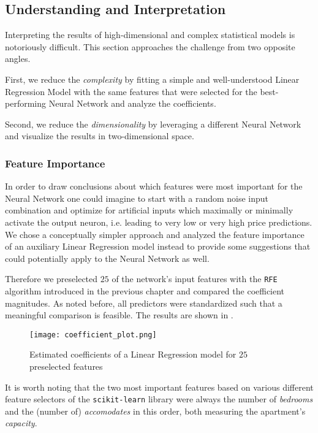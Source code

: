 \subsection{Understanding and Interpretation}

Interpreting the results of high-dimensional and complex statistical models is notoriously difficult.
This section approaches the challenge from two opposite angles.

First, we reduce the \emph{complexity} by fitting a simple and well-understood Linear Regression Model with the same features that were selected for the best-performing Neural Network and analyze the coefficients.

Second, we reduce the \emph{dimensionality} by leveraging a different Neural Network and visualize the results in two-dimensional space.

\subsubsection{Feature Importance}

In order to draw conclusions about which features were most important for the Neural Network one could imagine to start with a random noise input combination and optimize for artificial inputs which maximally or minimally activate the output neuron, i.e. leading to very low or very high price predictions.
We chose a conceptually simpler approach and analyzed the feature importance of an auxiliary Linear Regression model instead to provide some suggestions that could potentially apply to the Neural Network as well.

Therefore we preselected $25$ of the network's input features with the \texttt{RFE} algorithm introduced in the previous chapter and compared the coefficient magnitudes.
As noted before, all predictors were standardized such that a meaningful comparison is feasible.
The results are shown in .

\begin{figure}[t]
  \centering
  \texttt{[image: coefficient\_plot.png]}
  \caption{Estimated coefficients of a Linear Regression model for $25$ preselected features}
  \label{fig:coefficient-plot}
\end{figure}

It is worth noting that the two most important features based on various different feature selectors of the \texttt{scikit-learn} library were always the number of \emph{bedrooms} and the (number of) \emph{accomodates} in this order, both measuring the apartment's \emph{capacity}.

